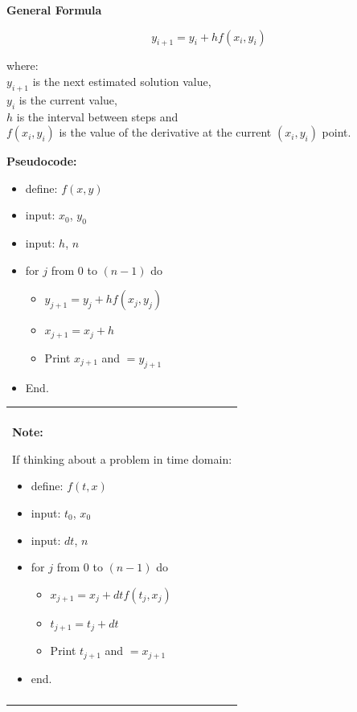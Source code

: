 \documentclass[10pt,b5paper,titlepage]{book}
\newenvironment{bbox}[1][1.0]
{
    \begin{center}
        \begin{tabular}{|p{#1\textwidth}|}
            \hline\\
}
{
            \\\\\hline
        \end{tabular}
    \end{center}
}
\begin{document}
\textbf{General Formula}

\begin{equation}
    y_{i+1} = y_i + h f(x_i,y_i)
\end{equation}

where:\\
$ y_{i+1} $ is the next estimated solution value,\\
$ y_i $ is the current value,\\
$ h $ is the interval between steps and\\
$ f(x_i,y_i) $ is the value of the derivative at the current $ (x_i,y_i) $ point.

\textbf{Pseudocode:}

\begin{itemize}
    \item define: $ f(x,y) $

    \item input: $ x_0 $, $ y_0 $

    \item input: $ h $, $ n $

    \item for $ j $ from $ 0 $ to $ (n-1) $ do
        \begin{itemize}
            \item $ y_{j+1} = y_j + hf(x_j, y_j) $
            \item $ x_{j+1} = x_j + h $
            \item Print $ x_{j+1} $ and $= y_{j+1} $
        \end{itemize}
    \item End.
\end{itemize}


\begin{bbox}[0.96]
\textbf{Note:}

If thinking about a problem in time domain:

\begin{itemize}
    \item define: $ f(t,x) $

    \item input: $ t_0 $, $ x_0 $

    \item input: $ dt $, $ n $

    \item for $ j $ from $ 0 $ to $ (n-1) $ do
        \begin{itemize}
            \item $ x_{j+1} = x_j + dt f(t_j, x_j) $
            \item $ t_{j+1} = t_j + dt $
            \item Print $ t_{j+1} $ and $= x_{j+1} $
        \end{itemize}
    \item end.
\end{itemize}

\end{bbox}
\end{document}
